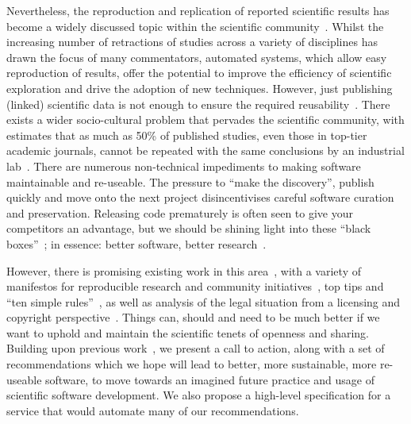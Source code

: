 \documentclass[a4paper,11pt]{article}
\begin{document}
Nevertheless, the reproduction and replication of reported scientific
results has become a widely discussed topic within the scientific
community~\cite{barnes:2010,morin-et-al:2012,joppa-et-al:2013}.
Whilst the increasing number of retractions of studies across a
variety of disciplines has drawn the focus of many commentators,
automated systems, which allow easy reproduction of results, offer the
potential to improve the efficiency of scientific exploration and
drive the adoption of new techniques. However, just publishing
(linked) scientific data is not enough to ensure the required
reusability~\cite{bechhofer-et-al:2013}. There exists a wider
socio-cultural problem that pervades the scientific community, with
estimates that as much as 50\% of published studies, even those in
top-tier academic journals, cannot be repeated with the same
conclusions by an industrial
lab~\cite{osherovich:2011,hesman-saey:2015}. There are numerous
non-technical impediments to making software maintainable and
re-useable. The pressure to ``make the discovery'', publish quickly
and move onto the next project disincentivises careful software
curation and preservation. Releasing code prematurely is often seen to
give your competitors an advantage, but we should be shining light
into these ``black boxes''~\cite{morin-et-al:2012}; in essence: better
software, better research~\cite{goble:2014}.

However, there is promising existing work in this
area~\cite{chirigati-et-al:2013,stodden+miguez:2014,stodden-et-al:2015,stodden-et-al:2016},
with a variety of manifestos for reproducible research and community
initiatives~\cite{rrspecissue:2008,gent:2013,fursin-et-al:2014,Bailey_setthe,james-et-al:2014},
top tips and ``ten simple
rules''~\cite{prlic+proctor:2012,masum-et-al:2013,sandve-et-al:2013,osborne-et-al:2013,goodman-et-al:2014,crick-et-al-irreprod:2015,list-et-al:2017},
as well as analysis of the legal situation from a licensing and
copyright perspective~\cite{stodden:2008}. Things can, should and need
to be much better if we want to uphold and maintain the scientific
tenets of openness and sharing. Building upon previous
work~\cite{crick-et-al_wssspe2,crick-et-al_recomp2014}, we present a
call to action, along with a set of recommendations which we hope will
lead to better, more sustainable, more re-useable software, to move
towards an imagined future practice and usage of scientific software
development. We also propose a high-level specification for a service
that would automate many of our recommendations.
\end{document}
